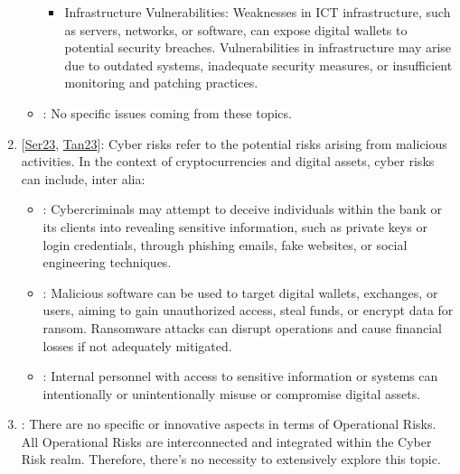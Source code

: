 \documentclass[letterpaper,10pt,english]{jupyterBook}
\begin{document}
\begin{enumerate}
\begin{itemize}
\begin{itemize}
\item {} 
\sphinxAtStartPar
Infrastructure Vulnerabilities: Weaknesses in ICT infrastructure, such as servers, networks, or software, can expose digital wallets to potential security breaches. Vulnerabilities in infrastructure may arise due to outdated systems, inadequate security measures, or insufficient monitoring and patching practices.

\end{itemize}

\item {} 
\sphinxAtStartPar
{}: No specific issues coming from these topics.

\end{itemize}

\item {} 
\sphinxAtStartPar
{} {[}\hyperlink{cite.ARM/arm:id148}{Ser23}, \hyperlink{cite.ARM/arm:id149}{Tan23}{]}: Cyber risks refer to the potential risks arising from malicious activities. In the context of cryptocurrencies and digital assets, cyber risks can include, inter alia:
\begin{itemize}
\item {} 
\sphinxAtStartPar
{}: Cybercriminals may attempt to deceive individuals within the bank or its clients into revealing sensitive information, such as private keys or login credentials, through phishing emails, fake websites, or social engineering techniques.

\item {} 
\sphinxAtStartPar
{}: Malicious software can be used to target digital wallets, exchanges, or users, aiming to gain unauthorized access, steal funds, or encrypt data for ransom. Ransomware attacks can disrupt operations and cause financial losses if not adequately mitigated.

\item {} 
\sphinxAtStartPar
{}: Internal personnel with access to sensitive information or systems can intentionally or unintentionally misuse or compromise digital assets.

\end{itemize}

\item {} 
\sphinxAtStartPar
{}: There are no specific or innovative aspects in terms of Operational Risks. All Operational Risks are interconnected and integrated within the Cyber Risk realm. Therefore, there’s no necessity to extensively explore this topic.

\end{enumerate}
\end{document}
